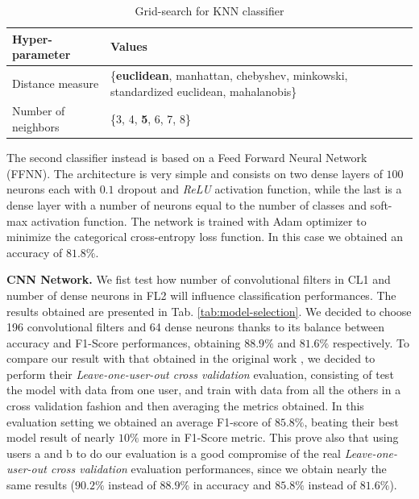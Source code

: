 \begin{table}[b]
	\centering
	\begin{tabular}{p{2.4cm}p{4.5cm}}
		\hline
		Hyper-parameter & Values \\
		\hline
		Distance measure & \{\textbf{euclidean}, manhattan, chebyshev, minkowski, standardized euclidean, mahalanobis\} \\
		Number of neighbors & \{3, 4, \textbf{5}, 6, 7, 8\} \\
		\hline
	\end{tabular}
	\caption{Grid-search for KNN classifier}
	\label{tab:knn-grid-search}
\end{table}

The second classifier instead is based on a Feed Forward Neural
Network (FFNN). The architecture is very simple and consists on two
dense layers of $100$ neurons each with $0.1$ dropout and
\textit{ReLU} activation function, while the last is a dense layer
with a number of neurons equal to the number of classes and soft-max
activation function. The network is trained with Adam optimizer to
minimize the categorical cross-entropy loss function. In this case we
obtained an accuracy of $81.8\%$.

\textbf{CNN Network.} We fist test how number of convolutional filters in CL1 and number of dense neurons in FL2 will influence classification performances. The results obtained are presented in Tab. \ref{tab:model-selection}. We decided to choose 196 convolutional filters and 64 dense neurons thanks to its balance between accuracy and F1-Score performances, obtaining $88.9\%$ and $81.6\%$ respectively. To compare our result with that obtained in the original work \cite{stisen2015smart}, we decided to perform their \textit{Leave-one-user-out cross validation} evaluation, consisting of test the model with data from one user, and train with data from all the others in a cross validation fashion and then averaging the metrics obtained. In this evaluation setting we obtained an average F1-score of $85.8\%$, beating their best model result of nearly $10\%$ more in F1-Score metric. This prove also that using users a and b to do our evaluation is a good compromise of the real \textit{Leave-one-user-out cross validation} evaluation performances, since we obtain nearly the same results ($90.2\%$ instead of $88.9\%$ in accuracy and $85.8\%$ instead of $81.6\%$).

